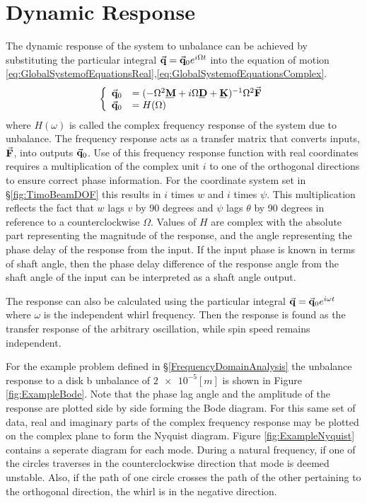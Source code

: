 \section{Dynamic Response}
The dynamic response of the system to unbalance can be achieved by substituting the particular integral $ \vec{\mathbf{q}}=\vec{\mathbf{q}}_0e^{i\Omega t} $ into the equation of motion \eqref{eq:GlobalSystemofEquationsReal},\eqref{eq:GlobalSystemofEquationsComplex}. 
\begin{equation}
\left\{\begin{array}{rl}
\vect{q}_0&=(-\Omega^2\mat{M}+i\Omega\mat{D}+\mat{K})^{-1}\Omega^2\vect{F}\\
\vect{q}_0&=H(\Omega)
\end{array}\right.
\end{equation}
where $ H(\omega) $ is called the complex frequency response of the system due to unbalance. The frequency response acts as a transfer matrix that converts inputs, $ \vec{\mathbf{F}} $, into outputs $ \vec{\mathbf{q}}_0 $. Use of this frequency response function with real coordinates requires a multiplication of the complex unit $ i $ to one of the orthogonal directions to ensure correct phase information. For the coordinate system set in \S\ref{fig:TimoBeamDOF} this results in $ i $ times $ w $ and $ i $ times $ \psi $. This multiplication reflects the fact that $ w $ lags $ v $ by 90 degrees and $ \psi $ lags $ \theta $ by 90 degrees in reference to a counterclockwise $ \Omega $. Values of $ H $ are complex with the absolute part representing the magnitude of the response, and the angle representing the phase delay of the response from the input. If the input phase is known in terms of shaft angle, then the phase delay difference of the response angle from the shaft angle of the input can be interpreted as a shaft angle output.\par 
The response can also be calculated using the particular integral $ \vec{\mathbf{q}}=\vec{\mathbf{q}}_0e^{i\omega t} $ where $ \omega $ is the independent whirl frequency. Then the response is found as the transfer response of the arbitrary oscillation, while spin speed remains independent.\par
For the example problem defined in \S\ref{FrequencyDomainAnalysis} the unbalance response to a disk b unbalance of $ \num{2e-5}[m] $ is shown in Figure \ref{fig:ExampleBode}. Note that the phase lag angle and the amplitude of the response are plotted side by side forming the Bode diagram. For this same set of data, real and imaginary parts of the complex frequency response may be plotted on the complex plane to form the Nyquist diagram. Figure \ref{fig:ExampleNyquist} contains a seperate diagram for each mode. During a natural frequency, if one of the circles traverses in the counterclockwise direction that mode is deemed unstable. Also, if the path of one circle crosses the path of the other pertaining to the orthogonal direction, the whirl is in the negative direction. 
